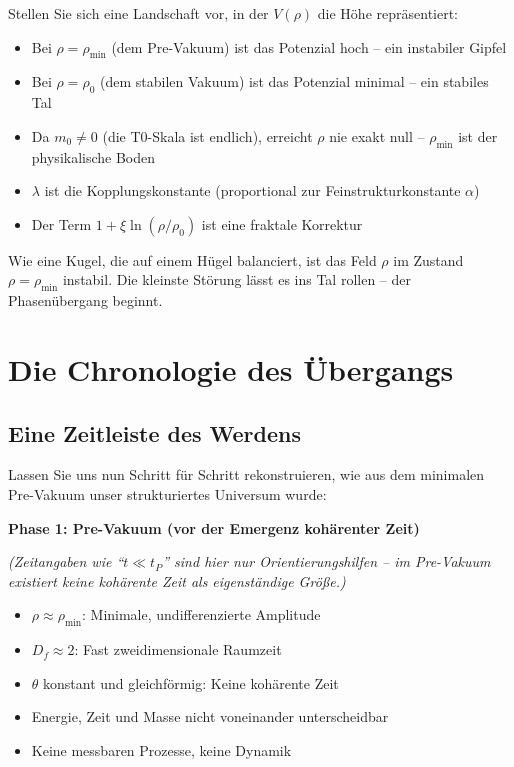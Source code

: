 	Stellen Sie sich eine Landschaft vor, in der $V(\rho)$ die Höhe repräsentiert:
	
	\begin{itemize}[leftmargin=*]
		\item Bei $\rho = \rho_{\min}$ (dem Pre-Vakuum) ist das Potenzial hoch -- ein instabiler Gipfel
		\item Bei $\rho = \rho_0$ (dem stabilen Vakuum) ist das Potenzial minimal -- ein stabiles Tal
		\item Da $m_0 \neq 0$ (die T0-Skala ist endlich), erreicht $\rho$ nie exakt null -- $\rho_{\min}$ ist der physikalische Boden
		\item $\lambda$ ist die Kopplungskonstante (proportional zur Feinstrukturkonstante $\alpha$)
		\item Der Term $1 + \xi \ln(\rho/\rho_0)$ ist eine fraktale Korrektur
	\end{itemize}
	
	Wie eine Kugel, die auf einem Hügel balanciert, ist das Feld $\rho$ im Zustand $\rho = \rho_{\min}$ instabil. Die kleinste Störung lässt es ins Tal rollen -- der Phasenübergang beginnt.
	
	\section{Die Chronologie des Übergangs}
	
	\subsection{Eine Zeitleiste des Werdens}
	
	Lassen Sie uns nun Schritt für Schritt rekonstruieren, wie aus dem minimalen Pre-Vakuum unser strukturiertes Universum wurde:
	
	\textbf{Phase 1: Pre-Vakuum (vor der Emergenz kohärenter Zeit)}
	
	\textit{(Zeitangaben wie \enquote{$t \ll t_P$} sind hier nur Orientierungshilfen -- im Pre-Vakuum existiert keine kohärente Zeit als eigenständige Größe.)}
	
	\begin{itemize}[leftmargin=*]
		\item $\rho \approx \rho_{\min}$: Minimale, undifferenzierte Amplitude
		\item $D_f \approx 2$: Fast zweidimensionale Raumzeit
		\item $\theta$ konstant und gleichförmig: Keine kohärente Zeit
		\item Energie, Zeit und Masse nicht voneinander unterscheidbar
		\item Keine messbaren Prozesse, keine Dynamik
	\end{itemize}
	
